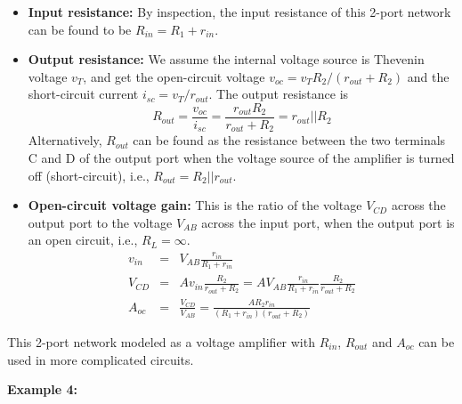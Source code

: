 \begin{itemize}
\item {\bf Input resistance:} By inspection, the input resistance of this
  2-port network can be found to be $R_{in}=R_1+r_{in}$.

\item {\bf Output resistance:} We assume the internal voltage source is 
  Thevenin voltage $v_T$, and get the open-circuit voltage 
  $v_{oc}=v_T R_2/(r_{out}+R_2)$ and the short-circuit current
  $i_{sc}=v_T/r_{out}$. The output resistance is
  \[ R_{out}=\frac{v_{oc}}{i_{sc}}=\frac{r_{out}R_2}{r_{out}+R_2}=r_{out}||R_2 \]
  Alternatively, $R_{out}$ can be found as the resistance between the two terminals
  C and D of the output port when the voltage source of the amplifier is turned off 
  (short-circuit), i.e., $R_{out}=R_2 || r_{out}$.

\item {\bf Open-circuit voltage gain:} This is the ratio of the voltage $V_{CD}$
  across the output port to the voltage $V_{AB}$ across the input port, when the
  output port is an open circuit, i.e., $R_L=\infty$. 
  \begin{eqnarray}
    v_{in}&=&V_{AB}\frac{r_{in}}{R_1+r_{in}}  \nonumber \\
    V_{CD}&=&A v_{in} \frac{R_2}{r_{out}+R_2}=A V_{AB}\frac{r_{in}}{R_1+r_{in}} 
    \frac{R_2}{r_{out}+R_2} \nonumber \\
    A_{oc}&=&\frac{V_{CD}}{V_{AB}}=\frac{A R_2 r_{in}}{(R_1+r_{in})(r_{out}+R_2)} 
    \nonumber 
  \end{eqnarray}
\end{itemize}
This 2-port network modeled as a voltage amplifier with $R_{in}$, $R_{out}$
and $A_{oc}$ can be used in more complicated circuits.

{\bf Example 4:} 


